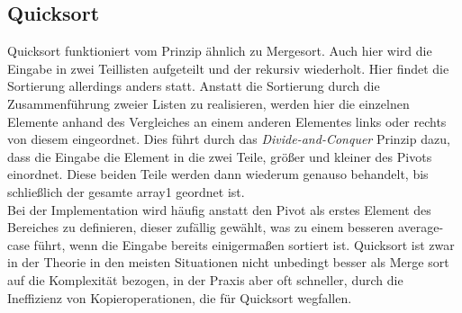 \documentclass[
../AuD-Zusammenfassung.tex,
]
{subfiles}
\begin{document}
\subsection{Quicksort}
\begin{algorithm}[H]
    
        
\end{algorithm}

Quicksort funktioniert vom Prinzip ähnlich zu Mergesort. Auch hier wird die Eingabe in zwei Teillisten aufgeteilt und der rekursiv wiederholt. Hier findet die Sortierung allerdings anders statt. Anstatt die Sortierung durch die Zusammenführung zweier Listen zu realisieren, werden hier die einzelnen Elemente anhand des Vergleiches an einem anderen Elementes links oder rechts von diesem eingeordnet. Dies führt durch das \textit{Divide-and-Conquer} Prinzip dazu, dass die Eingabe die Element in die zwei Teile, größer und kleiner des Pivots einordnet. Diese beiden Teile werden dann wiederum genauso behandelt, bis schließlich der gesamte array1 geordnet ist.\\
Bei der Implementation wird häufig anstatt den Pivot als erstes Element des Bereiches zu definieren, dieser zufällig gewählt, was zu einem besseren average-case führt, wenn die Eingabe bereits einigermaßen sortiert ist. 
Quicksort ist zwar in der Theorie in den meisten Situationen nicht unbedingt besser als Merge sort auf die Komplexität bezogen, in der Praxis aber oft schneller, durch die Ineffizienz von Kopieroperationen, die für Quicksort wegfallen.
\newpage
\end{document}

